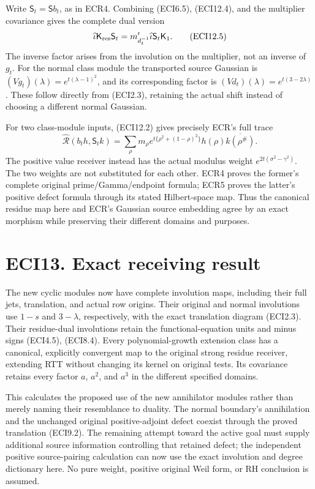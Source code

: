 Write \(\mathsf S_t=\mathsf S b_t\), as in ECR4. Combining (ECI6.5),
(ECI12.4), and the multiplier covariance gives the complete dual version
\[
\widehat\iota\mathsf K_{\rm res}\mathsf S_t
=m_{d_t^{-1}}'\widehat\iota\mathsf S_t\mathsf K_1.
\tag{ECI12.5}
\] The inverse factor arises from the involution on the multiplier, not
an inverse of \(g_t\). For the normal class module the transported
source Gaussian is \((Vg_t)(\lambda)=e^{t(\lambda-1)^2}\), and its
corresponding factor is \((Vd_t)(\lambda)=e^{t(3-2\lambda)}\). These
follow directly from (ECI2.3), retaining the actual shift instead of
choosing a different normal Gaussian.

For two class-module inputs, (ECI12.2) gives precisely ECR's full trace
\[
\widehat{\mathcal R}(b_th,\mathsf S_tk)
=\sum_\rho m_\rho e^{t\{\rho^2+(1-\rho)^2\}}
h(\rho)\overline{k(\rho^\#)}.
\tag{ECI12.6}
\] The positive value receiver instead has the actual modulus weight
\(e^{2t(\sigma^2-\gamma^2)}\). The two weights are not substituted for
each other. ECR4 proves the former's complete original
prime/Gamma/endpoint formula; ECR5 proves the latter's positive defect
formula through its stated Hilbert-space map. Thus the canonical residue
map here and ECR's Gaussian source embedding agree by an exact morphism
while preserving their different domains and purposes.

\section{ECI13. Exact receiving
result}\label{eci13.-exact-receiving-result}

The new cyclic modules now have complete involution maps, including
their full jets, translation, and actual row origins. Their original and
normal involutions use \(1-s\) and \(3-\lambda\), respectively, with the
exact translation diagram (ECI2.3). Their residue-dual involutions
retain the functional-equation units and minus signs (ECI4.5), (ECI8.4).
Every polynomial-growth extension class has a canonical, explicitly
convergent map to the original strong residue receiver, extending RTT
without changing its kernel on original tests. Its covariance retains
every factor \(a\), \(a^2\), and \(a^3\) in the different specified
domains.

This calculates the proposed use of the new annihilator modules rather
than merely naming their resemblance to duality. The normal boundary's
annihilation and the unchanged original positive-adjoint defect coexist
through the proved translation (ECI9.2). The remaining attempt toward
the active goal must supply additional source information controlling
that retained defect; the independent positive source-pairing
calculation can now use the exact involution and degree dictionary here.
No pure weight, positive original Weil form, or RH conclusion is
assumed.

